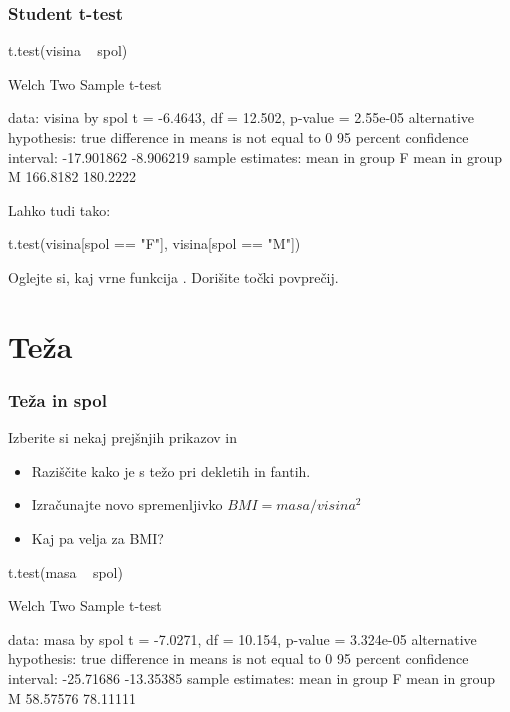 \begin{frame}[fragile]
\frametitle{Student t-test}
\begin{Schunk}
\begin{Sinput}
  t.test(visina ~ spol)
\end{Sinput}
\begin{Soutput}
	Welch Two Sample t-test

data:  visina by spol 
t = -6.4643, df = 12.502, p-value = 2.55e-05
alternative hypothesis: true difference in means is not equal to 0 
95 percent confidence interval:
 -17.901862  -8.906219 
sample estimates:
mean in group F mean in group M 
       166.8182        180.2222 
\end{Soutput}
\end{Schunk}
Lahko tudi tako:
\begin{Schunk}
\begin{Sinput}
  t.test(visina[spol == "F"], visina[spol == "M"])
\end{Sinput}
\end{Schunk}
Oglejte si, kaj vrne funkcija . Dorišite točki povprečij.
\end{frame}

\clearpage
\section{Teža}
\begin{frame}[fragile]
\frametitle{Teža in spol}
Izberite si nekaj prejšnjih prikazov in
\begin{itemize}
  \item Raziščite kako je s težo pri dekletih in fantih.
  \item Izračunajte novo spremenljivko $BMI=masa/visina^2$
  \item Kaj pa velja za BMI?
\end{itemize}

\end{frame}

\begin{Schunk}
\begin{Sinput}
  t.test(masa ~ spol)
\end{Sinput}
\begin{Soutput}
	Welch Two Sample t-test

data:  masa by spol 
t = -7.0271, df = 10.154, p-value = 3.324e-05
alternative hypothesis: true difference in means is not equal to 0 
95 percent confidence interval:
 -25.71686 -13.35385 
sample estimates:
mean in group F mean in group M 
       58.57576        78.11111 
\end{Soutput}
\end{Schunk}

